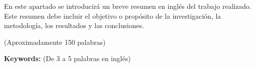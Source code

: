 
En este apartado se introducirá un breve resumen en inglés del trabajo realizado. Este resumen debe incluir el objetivo o propósito de la investigación, la metodología, los resultados y las conclusiones.

(Aproximadamente 150 palabras)

\textbf{Keywords:} (De 3 a 5 palabras en inglés)
\newpage